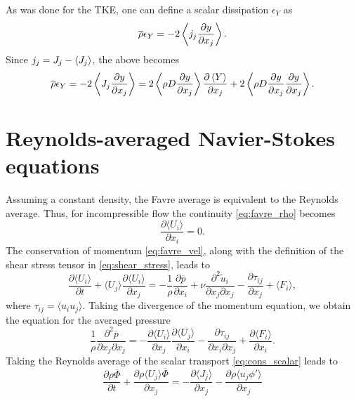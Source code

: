 \documentclass[oneside,a4paper,11pt]{report}
\newcommand{\rhoavg}{\overline{\rho}}
\newcommand{\pavg}{\overline{p}}
\newcommand{\rs}{\tau}          %
\newcommand{\uiavg}{\langle U_i \rangle}
\newcommand{\ujavg}{\langle U_j \rangle}
\newcommand{\uifluc}{u_i}
\newcommand{\ujfluc}{u_j}
\newcommand{\phiavg}{\overline{\Phi}}
\newcommand{\phifluc}{\phi'}
\newcommand{\uavgf}{\widetilde{u}}
\begin{document}
As was done for the TKE, one can define a scalar dissipation $\epsilon_Y$ as 
\begin{equation}
    \rhoavg \epsilon_Y = -2\lbra j_j \frac{\partial y}{\partial x_j} \rbra.
\end{equation}
Since $j_j = J_j - \left < J_j \right >$, the above becomes
\begin{equation}
    \rhoavg \epsilon_Y = -2\lbra J_j \frac{\partial y}{\partial x_j} \rbra = 2 \lbra \rho D \frac{\partial y}{\partial x_j} \rbra \frac{\partial \lbra Y \rbra}{\partial x_j} + 2 \lbra \rho D \frac{\partial y}{\partial x_j} \frac{\partial y}{\partial x_j} \rbra.
\end{equation}


\section{Reynolds-averaged Navier-Stokes equations}
Assuming a constant density, the Favre average is equivalent to the Reynolds average. Thus, for incompressible flow the continuity \cref{eq:favre_rho} becomes
\begin{equation}
\label{eq:rans_rho}
\frac{\partial \uiavg}{\partial x_i} = 0.
\end{equation}
The conservation of momentum \cref{eq:favre_vel}, along with the definition of the shear stress tensor in \cref{eq:shear_stress}, leads to 
\begin{equation}
\label{eq:rans_vel}
\frac{\partial \uiavg}{\partial t} + \ujavg \frac{\partial \uiavg}{\partial x_j} = -\frac{1}{\rho} \frac{\partial \pavg}{\partial x_i} + \nu \frac{ \partial^2 \uavgf_i }{ \partial x_j \partial x_j} - \frac{\partial \rs_{ij}}{\partial x_j} + \langle F_i \rangle,
\end{equation}
where $\rs_{ij} = \langle \uifluc \ujfluc \rangle$.
Taking the divergence of the momentum equation, we obtain the equation for the averaged pressure
\begin{equation}
\label{eq:rans_pressure}
\frac{1}{\rho} \frac{\partial^2 \pavg}{\partial x_j \partial x_j} = - \frac{\partial \uiavg}{\partial x_j} \frac{\partial \ujavg}{\partial x_i} - \frac{\partial \rs_{ij}}{\partial x_i \partial x_j} + \frac{ \partial \langle F_i \rangle}{ \partial x_i}.
\end{equation}
Taking the Reynolds average of the scalar transport \cref{eq:cons_scalar} leads to
\begin{equation}
\label{eq:rans_scalar}
    \frac{\partial \rho \phiavg}{\partial t} + \frac{\partial \rho \ujavg \phiavg}{\partial x_j} = -\frac{\partial \langle J_j \rangle}{\partial x_j} -\frac{\partial \rho \langle \ujfluc \phifluc \rangle }{\partial x_j}
\end{equation}
\end{document}
